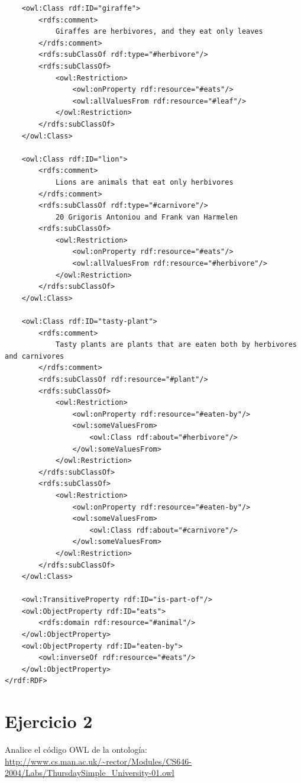 \documentclass[a4paper,12pt,twoside,final,spanish]{article}
\begin{document}
\begin{lstlisting}
	<owl:Class rdf:ID="giraffe">
		<rdfs:comment>
			Giraffes are herbivores, and they eat only leaves
		</rdfs:comment>
		<rdfs:subClassOf rdf:type="#herbivore"/>
		<rdfs:subClassOf>
			<owl:Restriction>
				<owl:onProperty rdf:resource="#eats"/>
				<owl:allValuesFrom rdf:resource="#leaf"/>
			</owl:Restriction>
		</rdfs:subClassOf>
	</owl:Class>
	
	<owl:Class rdf:ID="lion">
		<rdfs:comment>
			Lions are animals that eat only herbivores
		</rdfs:comment>
		<rdfs:subClassOf rdf:type="#carnivore"/>
			20 Grigoris Antoniou and Frank van Harmelen
		<rdfs:subClassOf>
			<owl:Restriction>
				<owl:onProperty rdf:resource="#eats"/>
				<owl:allValuesFrom rdf:resource="#herbivore"/>
			</owl:Restriction>
		</rdfs:subClassOf>
	</owl:Class>
	
	<owl:Class rdf:ID="tasty-plant">
		<rdfs:comment>
			Tasty plants are plants that are eaten both by herbivores and carnivores
		</rdfs:comment>
		<rdfs:subClassOf rdf:resource="#plant"/>
		<rdfs:subClassOf>
			<owl:Restriction>
				<owl:onProperty rdf:resource="#eaten-by"/>
				<owl:someValuesFrom>
					<owl:Class rdf:about="#herbivore"/>
				</owl:someValuesFrom>
			</owl:Restriction>
		</rdfs:subClassOf>
		<rdfs:subClassOf>
			<owl:Restriction>
				<owl:onProperty rdf:resource="#eaten-by"/>
				<owl:someValuesFrom>
					<owl:Class rdf:about="#carnivore"/>
				</owl:someValuesFrom>
			</owl:Restriction>
		</rdfs:subClassOf>
	</owl:Class>
	
	<owl:TransitiveProperty rdf:ID="is-part-of"/>
	<owl:ObjectProperty rdf:ID="eats">
		<rdfs:domain rdf:resource="#animal"/>
	</owl:ObjectProperty>
	<owl:ObjectProperty rdf:ID="eaten-by">
		<owl:inverseOf rdf:resource="#eats"/>
	</owl:ObjectProperty>
</rdf:RDF>
\end{lstlisting}

\section*{Ejercicio 2}

Analice el código OWL de la ontología:\\
\url{http://www.cs.man.ac.uk/~rector/Modules/CS646-2004/Labs/ThursdaySimple_University-01.owl}
\end{document}
